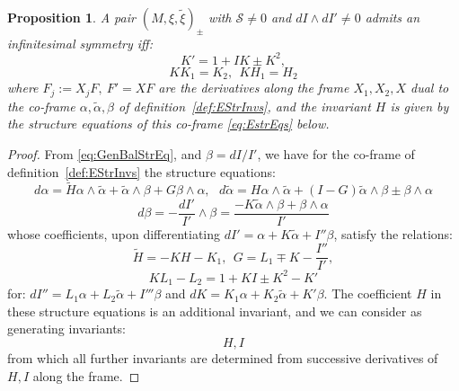 \documentclass[10pt]{amsart}
\newtheorem{prop}[thm]{Proposition}
\theoremstyle{definition}
\begin{document}
\begin{prop}\label{prop:GenSymm}
    A pair $(M, \xi, \tilde \xi)_\pm$ with $\mathcal{S}\ne 0$ and $dI\wedge dI'\ne 0$ admits an infinitesimal symmetry iff:
    \[ K' = 1 + IK \pm K^2, \]
    \[ K K_1 = K_2, ~~ K H_1 = H_2 \]
    where $F_j := X_j F, ~F' = XF$ are the derivatives along the frame $X_1, X_2, X$ dual to the co-frame $\alpha, \tilde\alpha, \beta$ of definition~\ref{def:EStrInvs}, and the invariant $H$ is given by the structure equations of this co-frame \eqref{eq:EstrEqs} below. 
\end{prop}
\begin{proof}
    From \eqref{eq:GenBalStrEq}, and $\beta = dI/I'$, we have for the co-frame of definition~\ref{def:EStrInvs} the structure equations:
    \begin{equation}\label{eq:EstrEqs}
        d\alpha = \tilde H \alpha\wedge\tilde\alpha + \tilde\alpha\wedge\beta + G \beta\wedge\alpha , ~~~d\tilde\alpha = H \alpha\wedge\tilde\alpha + (I-G)\tilde\alpha\wedge\beta \pm \beta\wedge\alpha 
    \end{equation}
    \[ d\beta = - \frac{dI'}{I'}\wedge\beta = \frac{-K\tilde\alpha\wedge\beta + \beta\wedge\alpha}{I'} \]
    whose coefficients, upon differentiating $dI' = \alpha + K \tilde\alpha + I''\beta$, satisfy the relations:
    \[ \tilde H = - KH -K_1, ~~G = L_1 \mp  K - \frac{I''}{I'},  \]
    \[ KL_1 - L_2 = 1 + KI \pm  K^2 - K' \]
    for: $dI'' = L_1 \alpha + L_2 \tilde\alpha + I'''\beta$ and $dK = K_1 \alpha + K_2 \tilde\alpha + K'\beta$. The coefficient $H$ in these structure equations is an additional invariant, and we can consider as generating invariants:
    \[ H, I \]
    from which all further invariants are determined from successive derivatives of $H,I$ along the frame.
    

\end{proof}
\end{document}
